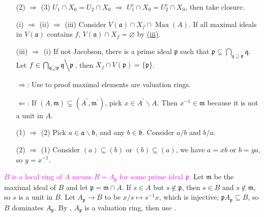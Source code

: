 \begin{exercise}\label{ex5.26}
	\begin{enumerate}
		\item[(2) $\Rightarrow$ (3)] $U_1\cap X_0=U_2\cap X_0$ $\Rightarrow$ $U_1^c\cap X_0=U_2^c\cap X_0$, then take closure.
		\item[(i) $\Rightarrow$ (ii) $\Rightarrow$ (iii)] Consider $V(\mathfrak{a})\cap X_f\cap\operatorname{Max}(A)$. If all maximal ideals in $V(\mathfrak{a})$ contains $f$, $V(\mathfrak{a})\cap X_f=\varnothing$ by \hyperref[ex5.23]{(iii)}.
		\item[(iii) $\Rightarrow$ (i)] If not Jacobson, there is a prime ideal $\mathfrak{p}$ such that $\mathfrak{p}\subsetneq\bigcap_{\mathfrak{q}\supseteq\mathfrak{p}}\mathfrak{q}$. Let $f\in\left.\bigcap_{\mathfrak{q}\supseteq\mathfrak{p}}\mathfrak{q}\middle\backslash\mathfrak{p}\right.$, then $X_f\cap V(\mathfrak{p})=\{\mathfrak{p}\}$.
	\end{enumerate}
\end{exercise}

\begin{exercise}\label{ex5.27}
	\begin{enumerate}
		\item[$\Rightarrow$:] Use  to proof maximal elements are valuation rings.
		\item[$\Leftarrow$:] If $(A,\mathfrak{m})\subsetneq(A^\prime,\mathfrak{m}^\prime)$, pick $x\in A^\prime\backslash A$. Then $x^{-1}\in\mathfrak{m}$ because it is not a unit in $A$.
	\end{enumerate}
\end{exercise}

\begin{exercise}\label{ex5.28}
	\begin{enumerate}
		\item[(1) $\Rightarrow$ (2)] Pick $a\in\mathfrak{a}\backslash\mathfrak{b}$, and any $b\in\mathfrak{b}$. Consider $a/b$ and $b/a$.
		\item[(2) $\Rightarrow$ (1)] Consider $(a)\subseteq(b)$ or $(b)\subseteq(a)$, we have $a=xb$ or $b=ya$, so $y=x^{-1}$.
	\end{enumerate}
\end{exercise}

\begin{exercise}\label{ex5.29}
	\textcolor{magenta}{$B$ is a local ring of $A$ means $B=A_\mathfrak{p}$ for some prime ideal $\mathfrak{p}$.} Let $\mathfrak{m}$ be the maximal ideal of $B$ and let $\mathfrak{p}=\mathfrak{m}\cap A$. If $s\in A$ but $s\notin\mathfrak{p}$, then $s\in B$ and $s\notin\mathfrak{m}$, so $s$ is a unit in $B$. Let $A_\mathfrak{p}\rightarrow B$ to be $x/s\mapsto s^{-1}x$, which is injective; $\mathfrak{p}A_\mathfrak{p}\subseteq B$, so $B$ dominates $A_\mathfrak{p}$. By , $A_\mathfrak{p}$ is a valuation ring, then use .
\end{exercise}

